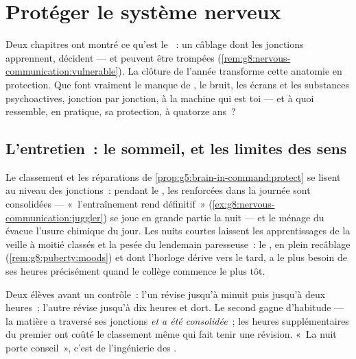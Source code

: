 \chapter{Protéger le système nerveux}\label{ch:g8:protecting-the-nervous-system}

Deux chapitres ont montré ce qu'est le ~: un
câblage dont les jonctions apprennent, décident --- et
peuvent être trompées
(\cref{rem:g8:nervous-communication:vulnerable}). La
clôture de l'année transforme cette anatomie en protection.
Que font vraiment le manque de , le bruit, les écrans
et les substances psychoactives, jonction par jonction, à la
machine qui est toi --- et à quoi ressemble, en pratique, sa
protection, à quatorze ans~?

\section{L'entretien~: le sommeil, et les limites des sens}

\begin{proposition}\label{prop:g8:protecting-the-nervous-system:sleep}
Le classement et les réparations de
\cref{prop:g5:brain-in-command:protect} se lisent au niveau
des jonctions~: pendant le , les  renforcées
dans la journée sont consolidées --- «~l'entraînement rend
définitif~» (\cref{ex:g8:nervous-communication:juggler}) se
joue en grande partie la nuit --- et le ménage du 
évacue l'usure chimique du jour. Les nuits courtes laissent
les apprentissages de la veille à moitié classés et la
pesée du lendemain paresseuse~: le  , en
plein recâblage (\cref{rem:g8:puberty:moods}) et dont
l'horloge dérive vers le tard, a le plus besoin de ses
heures précisément quand le collège commence le plus tôt.
\end{proposition}
\admitted

\begin{example}\label{ex:g8:protecting-the-nervous-system:revision}
Deux élèves avant un contrôle~: l'un révise jusqu'à minuit
puis jusqu'à deux heures~; l'autre révise jusqu'à dix
heures et dort. Le second gagne d'habitude --- la matière a
traversé ses jonctions \emph{et a été consolidée}~; les
heures supplémentaires du premier ont coûté le classement
même qui fait tenir une révision. «~La nuit porte
conseil~», c'est de l'ingénierie des .
\end{example}

